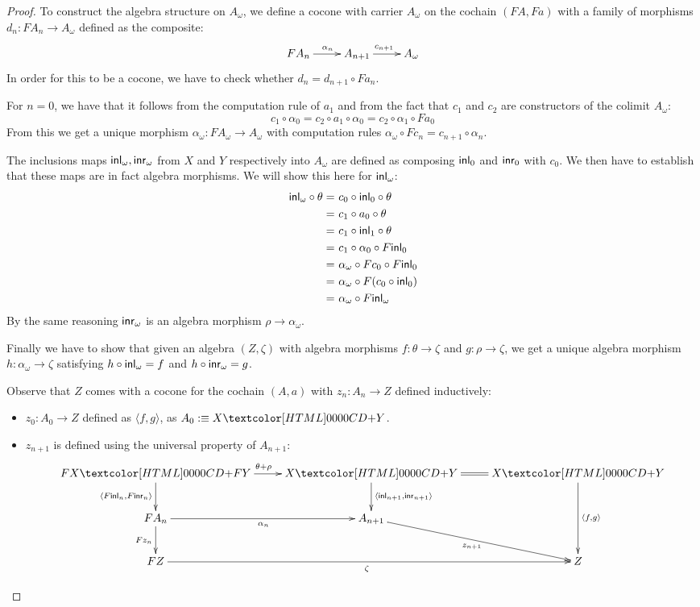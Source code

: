 \begin{proof}
  To construct the algebra structure on $A_{\omega}$, we define a
  cocone with carrier $A_{\omega}$ on the cochain $(FA, Fa)$ with a
  family of morphisms $d_n : FA_n \to A_{\omega}$ defined as the
  composite:
  $$
  \xymatrix{
    FA_n \ar[r]^{\alpha_n}
    &A_{n+1}
    \ar[r]^{c_{n+1}}
    &A_{\omega}
  }
  $$
  In order for this to be a cocone, we have to check whether
  $d_n = d_{n+1} \circ F a_n$.

  For $n = 0$, we have that it follows from the computation rule of
  $a_1$ and from the fact that $c_1$ and $c_2$ are constructors of the
  colimit $A_{\omega}$:
  $$
  c_1 \circ \alpha_0 = c_2 \circ a_1 \circ \alpha_0 = c_2 \circ \alpha_1 \circ Fa_0
  $$
  From this we get a unique morphism
  $\alpha_{\omega} : FA_{\omega} \to A_{\omega}$ with computation
  rules $\alpha_{\omega} \circ Fc_n = c_{n+1} \circ \alpha_n$.

  The inclusions maps $\inln{\omega}, \inrn{\omega}$ from $X$ and $Y$
  respectively into $A_{\omega}$ are defined as composing $\inln{0}$
  and $\inrn{0}$ with $c_0$. We then have to establish that these maps
  are in fact algebra morphisms. We will show this here for
  $\inln{\omega}$:
  \begin{align*}
    \inln{\omega} \circ \theta =&\ c_0 \circ \inln{0} \circ \theta \\
    =&\ c_1 \circ a_0 \circ \theta \\
    =&\ c_1 \circ \inln{1} \circ \theta \\
    =&\ c_1 \circ \alpha_0 \circ F \inln{0} \\
    =&\ \alpha_{\omega} \circ F c_0 \circ F \inln{0} \\
    =&\ \alpha_{\omega} \circ F (c_0 \circ \inln{0}) \\
    =&\ \alpha_{\omega} \circ F \inln{\omega}
  \end{align*}
  By the same reasoning $\inr_{\omega}$ is an algebra morphism
  $\rho \to \alpha_{\omega}$.

  Finally we have to show that given an algebra $(Z,\zeta)$ with
  algebra morphisms $f : \theta \to \zeta$ and $g : \rho \to \zeta$,
  we get a unique algebra morphism $h : \alpha_{\omega} \to \zeta$
  satisfying $h \circ \inln{\omega} = f$ and $h \circ \inrn{\omega} = g$.

  Observe that $Z$ comes with a cocone for the cochain $(A,a)$ with
  $z_n : A_n \to Z$ defined inductively:
  \begin{itemize}
  \item $z_0  : A_0 \to Z$ defined as $\langle f , g \rangle$, as $A_0 \ddefeq \coproduct{X}{Y}$.
  \item $z_{n+1}$ is defined using the universal property of
    $A_{n+1}$:
    $$
    \xymatrix{
      \coproduct{FX}{FY} \ar[r]^{\theta + \rho} \ar[d]_{\langle F \inln{n} , F \inrn{n} \rangle} 
      &\coproduct{X}{Y} \ar[d]^{\langle \inln{n+1} , \inrn{n+1} \rangle} \ar@{=}[r]
      &\coproduct{X}{Y} \ar[dd]^{\langle f , g \rangle} \\
      FA_n \ar[r]_{\alpha_n} \ar[d]_{F z_n}
      &A_{n+1} \ar[dr]_{z_{n+1}}
      \\
      FZ \ar[rr]_{\zeta}
      &&Z
    }
    $$
  \end{itemize}


\end{proof}
